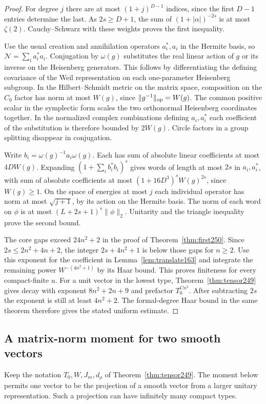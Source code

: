 \documentclass[a4paper,11pt]{article}
\theoremstyle{definition}
\theoremstyle{remark}
\numberwithin{equation}{section}
\begin{document}
\begin{proof}
For degree \(j\) there are at most \((1+j)^{D-1}\) indices,
since the first \(D-1\) entries determine the last. As
\(2s\ge D+1\), the sum of \((1+|\alpha|)^{-2s}\) is at most
\(\zeta(2)\). Cauchy--Schwarz with these weights proves the
first inequality.

Use the usual creation and annihilation operators \(a_i^*,a_i\)
in the Hermite basis, so \(\mathcal N=\sum_i a_i^*a_i\).
Conjugation by \(\omega(g)\) substitutes the real linear action
of \(g\) or its inverse on the Heisenberg generators. This
follows by differentiating the defining covariance of the Weil
representation on each one-parameter Heisenberg subgroup.
In the Hilbert--Schmidt metric on the matrix space, composition
on the \(C_0\) factor has norm at most \(W(g)\), since
\(\|g^{-1}\|_{\rm op}=W(g)\).
The common positive scalar in the symplectic form scales the
two orthonormal Heisenberg coordinates together. In the
normalized complex combinations defining \(a_i,a_i^*\) each
coefficient of the substitution is therefore bounded by
\(2W(g)\). Circle factors in a group splitting disappear in
conjugation.

Write \(b_i=\omega(g)^{-1}a_i\omega(g)\). Each has sum of
absolute linear coefficients at most \(4DW(g)\). Expanding
\((1+\sum_i b_i^* b_i)^s\) gives words of length at most \(2s\)
in \(a_i,a_i^*\), with sum of absolute coefficients at most
\((1+16D^3)^s W(g)^{2s}\), since \(W(g)\ge1\). On the space of
energies at most \(j\) each individual operator has norm at
most \(\sqrt{j+1}\), by its action on the Hermite basis.
The norm of each word on \(\phi\) is at most
\((L+2s+1)^s\|\phi\|_2\). Unitarity and the triangle inequality
prove the second bound.

The core gaps exceed \(24n^2+2\) in the proof of
Theorem~\ref{thm:first250}. Since \(2s\le2n^2+4n+2\),
the integer \(2s+4n^2+1\) is below those gaps for \(n\ge2\).
Use this exponent for the coefficient in
Lemma~\ref{lem:translate163} and integrate the remaining
power \(W^{-(4n^2+1)}\) by its Haar bound. This proves
finiteness for every compact-finite \(u\). For a unit vector
in the lowest type, Theorem~\ref{thm:tensor249} gives decay
with exponent \(8n^2+2n+9\) and prefactor \(T_0^{C n^3}\).
After subtracting \(2s\) the exponent is still at least
\(4n^2+2\). The formal-degree Haar bound in the same theorem
therefore gives the stated uniform estimate.
\end{proof}

\subsection{A matrix-norm moment for two smooth vectors}\label{nav:IX-35}
Keep the notation \(T_0,W,J_m,d_\rho\) of Theorem~\ref{thm:tensor249}.
The moment below permits one vector to be the projection of a smooth
vector from a larger unitary representation. Such a projection can
have infinitely many compact types.
\end{document}
